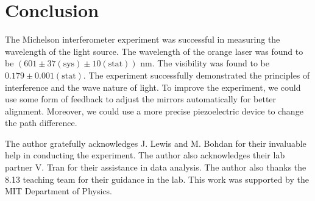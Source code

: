 \section{Conclusion}
The Michelson interferometer experiment was successful in measuring the wavelength of the light source. The wavelength of the orange laser was found to be $(601\pm37(\text{sys})\pm10(\text{stat}))\text{ nm}$. The visibility was found to be $0.179\pm0.001(\text{stat})$. The experiment successfully demonstrated the principles of interference and the wave nature of light. To improve the experiment, we could use some form of feedback to adjust the mirrors automatically for better alignment. Moreover, we could use a more precise piezoelectric device to change the path difference. 

\begin{acknowledgments} The author gratefully acknowledges J. Lewis and M. Bohdan for their invaluable help in conducting the experiment. The author also acknowledges their lab partner V. Tran for their assistance in data analysis. The author also thanks the 8.13 teaching team for their guidance in the lab. This work was supported by the MIT Department of Physics. 
\end{acknowledgments}





